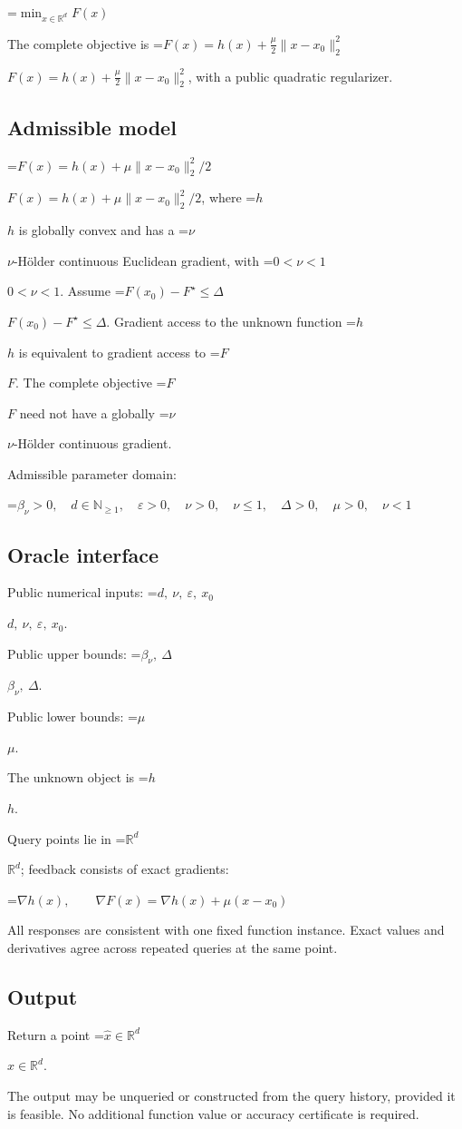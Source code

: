 \documentclass[10pt,a4paper]{article}
\newcommand{\AtlasMath}[1]{\par\begingroup\centering\setbox0=\hbox{$\displaystyle #1$}\ifdim\wd0>1.4\linewidth\typeout{ATLAS WIDE FORMULA: \the\wd0}\fi\ifdim\wd0>\linewidth\resizebox{\linewidth}{!}{\box0}\else\box0\fi\par\endgroup}
\newcommand{\AtlasInlineMath}[1]{\begingroup\setbox0=\hbox{$#1$}\ifdim\wd0>.4\linewidth\endgroup\AtlasMath{#1}\else\endgroup$#1$\fi}
\begin{document}
\AtlasMath{\min_{x\in \mathbb{R}^d}F(x)}


The complete objective is \AtlasInlineMath{F(x)=h(x)+\frac\mu2\|x-x_0\|_2^2}, with a public quadratic regularizer.

\subsection{Admissible model}
\AtlasInlineMath{F(x)=h(x)+\mu\|x-x_0\|_2^2/2}, where \AtlasInlineMath{h} is globally convex and has a \AtlasInlineMath{\nu}-Hölder continuous Euclidean gradient, with \AtlasInlineMath{0<\nu<1}. Assume \AtlasInlineMath{F(x_0)-F^\star\le\Delta}. Gradient access to the unknown function \AtlasInlineMath{h} is equivalent to gradient access to \AtlasInlineMath{F}. The complete objective \AtlasInlineMath{F} need not have a globally \AtlasInlineMath{\nu}-Hölder continuous gradient.

Admissible parameter domain:


\AtlasMath{\beta_\nu>0,\quad d\in\mathbb{N}_{\ge1},\quad \varepsilon>0,\quad \nu>0,\quad \nu\le1,\quad \Delta>0,\quad \mu>0,\quad \nu<1}


\subsection{Oracle interface}
Public numerical inputs: \AtlasInlineMath{d,\ \nu,\ \varepsilon,\ x_0}.

Public upper bounds: \AtlasInlineMath{\beta_\nu,\ \Delta}.

Public lower bounds: \AtlasInlineMath{\mu}.

The unknown object is \AtlasInlineMath{h}.

Query points lie in \AtlasInlineMath{\mathbb{R}^d}; feedback consists of exact gradients:


\AtlasMath{\nabla h(x),\qquad\nabla F(x)=\nabla h(x)+\mu(x-x_0)}


All responses are consistent with one fixed function instance. Exact values and derivatives agree across repeated queries at the same point.

\subsection{Output}
Return a point \AtlasInlineMath{\widehat x\in\mathbb R^d}.

The output may be unqueried or constructed from the query history, provided it is feasible. No additional function value or accuracy certificate is required.
\end{document}
